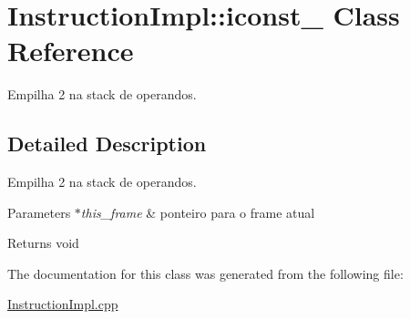 \hypertarget{class_instruction_impl_1_1iconst__2}{}\section{Instruction\+Impl\+:\+:iconst\+\_ Class Reference}
\label{class_instruction_impl_1_1iconst__2}


Empilha 2 na stack de operandos.  




\subsection{Detailed Description}
Empilha 2 na stack de operandos. 


\begin{DoxyParams}{Parameters}
{\em $\ast$this\+\_\+frame} & ponteiro para o frame atual \\
\hline
\end{DoxyParams}
\begin{DoxyReturn}{Returns}
void 
\end{DoxyReturn}


The documentation for this class was generated from the following file\+:\begin{DoxyCompactItemize}
\item 
\hyperlink{_instruction_impl_8cpp}{Instruction\+Impl.\+cpp}\end{DoxyCompactItemize}

